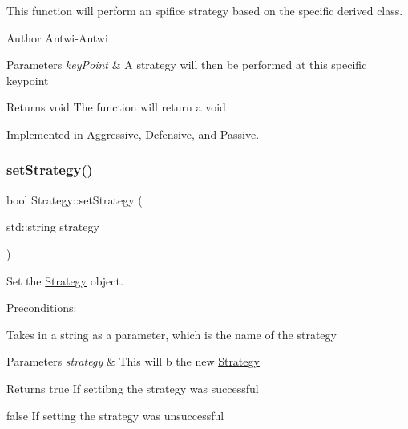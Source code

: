 This function will perform an spifice strategy based on the specific derived class. 

\begin{DoxyAuthor}{Author}
Antwi-\/\+Antwi 
\end{DoxyAuthor}

\begin{DoxyParams}{Parameters}
{\em key\+Point} & A strategy will then be performed at this specific keypoint \\
\hline
\end{DoxyParams}
\begin{DoxyReturn}{Returns}
void The function will return a void 
\end{DoxyReturn}


Implemented in \hyperlink{classAggressive_a84122a24be95be256f9992c21127b0d1}{Aggressive}, \hyperlink{classDefensive_a4cc4f2f71160bcade2cf2be8ade39903}{Defensive}, and \hyperlink{classPassive_ab296d4f8ba8ad68dacef1f80e3041aa7}{Passive}.

\mbox{\label{classStrategy_a35c4bbd2d37efaf24e21b7a0e82b4c96}} 
\subsubsection{\texorpdfstring{set\+Strategy()}{setStrategy()}}
{\footnotesize\ttfamily bool Strategy\+::set\+Strategy (\begin{DoxyParamCaption}\item[{std\+::string}]{strategy }\end{DoxyParamCaption})}



Set the \hyperlink{classStrategy}{Strategy} object. 

Preconditions\+:
\begin{DoxyItemize}
\item Takes in a string as a parameter, which is the name of the strategy
\end{DoxyItemize}


\begin{DoxyParams}{Parameters}
{\em strategy} & This will b the new \hyperlink{classStrategy}{Strategy}\\
\hline
\end{DoxyParams}
\begin{DoxyReturn}{Returns}
true If settibng the strategy was successful

false If setting the strategy was unsuccessful 
\end{DoxyReturn}


